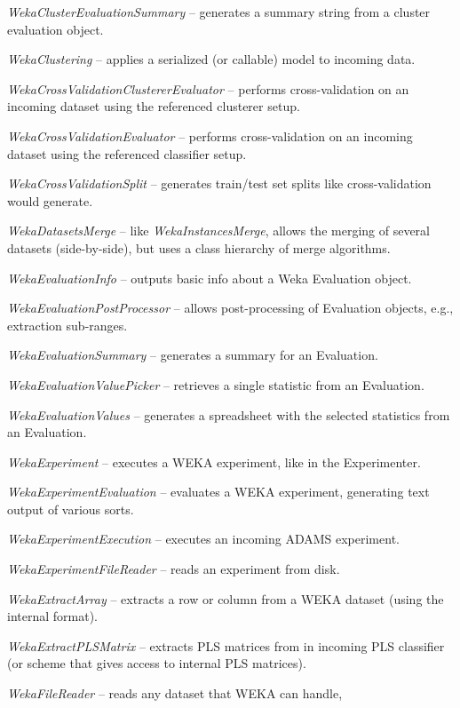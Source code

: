 \begin{tight_itemize}
	\item \textit{WekaClusterEvaluationSummary} -- generates a summary string
	from a cluster evaluation object.
	\item \textit{WekaClustering} -- applies a serialized (or callable) model
	to incoming data.
	\item \textit{WekaCrossValidationClustererEvaluator} -- performs cross-validation
	on an incoming dataset using the referenced clusterer setup.
	\item \textit{WekaCrossValidationEvaluator} -- performs cross-validation
	on an incoming dataset using the referenced classifier setup.
	\item \textit{WekaCrossValidationSplit} -- generates train/test set splits
	like cross-validation would generate.
	\item \textit{WekaDatasetsMerge} -- like \textit{WekaInstancesMerge},
	allows the merging of several datasets (side-by-side), but uses a class
	hierarchy of merge algorithms.
	\item \textit{WekaEvaluationInfo} -- outputs basic info about a Weka
	Evaluation object.
	\item \textit{WekaEvaluationPostProcessor} -- allows post-processing
	of Evaluation objects, e.g., extraction sub-ranges.
	\item \textit{WekaEvaluationSummary} -- generates a summary for an
	Evaluation.
	\item \textit{WekaEvaluationValuePicker} -- retrieves a single statistic
	from an Evaluation.
	\item \textit{WekaEvaluationValues} -- generates a spreadsheet with the
	selected statistics from an Evaluation.
	\item \textit{WekaExperiment} -- executes a WEKA experiment, like in the 
	Experimenter.
	\item \textit{WekaExperimentEvaluation} -- evaluates a WEKA experiment,
	generating text output of various sorts.
	\item \textit{WekaExperimentExecution} -- executes an incoming ADAMS
	experiment.
	\item \textit{WekaExperimentFileReader} -- reads an experiment from disk.
	\item \textit{WekaExtractArray} -- extracts a row or column from a WEKA
	dataset (using the internal format).
	\item \textit{WekaExtractPLSMatrix} -- extracts PLS matrices from in
	incoming PLS classifier (or scheme that gives access to internal PLS matrices).
	\item \textit{WekaFileReader} -- reads any dataset that WEKA can handle,

\end{tight_itemize}
